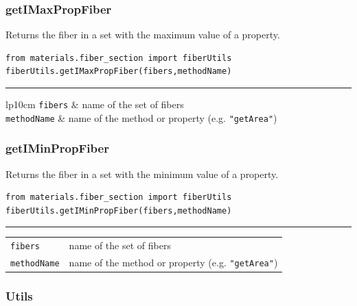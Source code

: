 \subsubsection{getIMaxPropFiber}
Returns the fiber in a set with the maximum value of a property.
\noindent 
\begin{verbatim}
from materials.fiber_section import fiberUtils
fiberUtils.getIMaxPropFiber(fibers,methodName)
\end{verbatim}
\vspace{-10pt}
{\color{grayLines} \rule{\linewidth}{0.25pt}}
\begin{center}
\begin{tabular}{lp{10cm}}
{\tt fibers} & name of the set of fibers \\
{\tt methodName} & name of the method or property (e.g. {\tt "getArea"}) \\
\end{tabular}
\end{center}

\subsubsection{getIMinPropFiber}
Returns the fiber in a set with the minimum value of a property.
\noindent 
\begin{verbatim}
from materials.fiber_section import fiberUtils
fiberUtils.getIMinPropFiber(fibers,methodName)
\end{verbatim}
\vspace{-10pt}
{\color{grayLines} \rule{\linewidth}{0.25pt}}
\begin{center}
\begin{tabular}{lp{10cm}}
{\tt fibers} & name of the set of fibers \\
{\tt methodName} & name of the method or property (e.g. {\tt "getArea"}) \\
\end{tabular}
\end{center}


\subsubsection{Utils}
